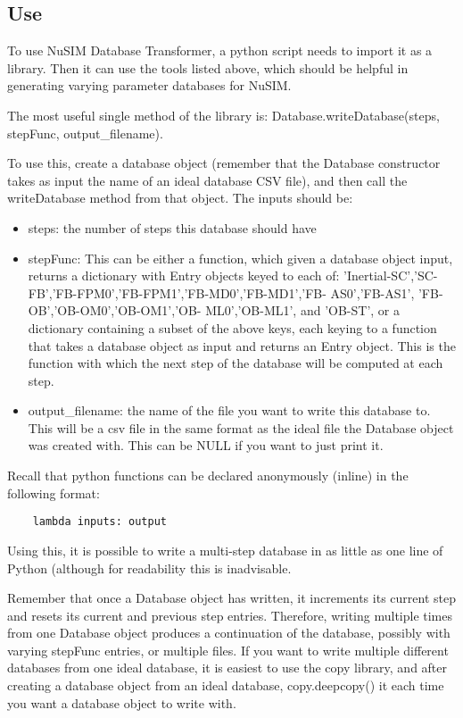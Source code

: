 \subsection{Use}
	To use NuSIM Database Transformer, a python script needs to import 
it as a library. Then it can use the tools listed above, which should be 
helpful in generating varying parameter databases for NuSIM. 

	The most useful single method of the library is:
Database.writeDatabase(steps, stepFunc, output\_filename).

	To use this, create a database object (remember that the Database 
constructor takes as input the name of an ideal database CSV file), and 
then call the writeDatabase method from that object. The inputs should be:
\begin{itemize}
\item		steps:	the number of steps this database should have
\item		stepFunc:	This can be either a function, which given 
			a database object input, returns a dictionary with 
			Entry objects  keyed to each of: 'Inertial-SC','SC-
			FB','FB-FPM0','FB-FPM1','FB-MD0','FB-MD1','FB-
			AS0','FB-AS1', 'FB-OB','OB-OM0','OB-OM1','OB-
			ML0','OB-ML1', and 'OB-ST', or a dictionary 
			containing a subset of the above keys, each keying 
			to a function that takes a database object as input 
			and returns an Entry object. 
			This is the function with which the next step of 
			the database will be computed at each step. 
\item		output\_filename:	the name of the file you want to 
			write this database to. This will be a csv file in 
			the same format as the ideal file the Database 
			object was created with. This can be NULL if you 
			want to just print it. 
\end{itemize}
	Recall that python functions can be declared anonymously (inline) 
in the following format:
\begin{verbatim}
	lambda inputs: output
\end{verbatim}
Using this, it is possible to write a multi-step database in as little as 
one line of Python (although for readability this is inadvisable. 

	Remember that once a Database object has written, it increments its 
current step and resets its current and previous step entries. Therefore, 
writing multiple times from one Database object produces a continuation of 
the database, possibly with varying stepFunc entries, or multiple files. If 
you want to write multiple different databases from one ideal database, it 
is easiest to use the copy library, and after creating a database object 
from an ideal database, copy.deepcopy() it each time you want a database 
object to write with. 


